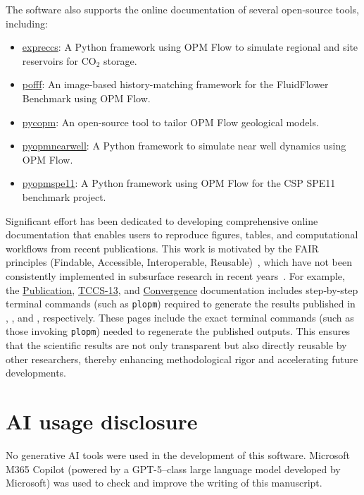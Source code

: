 \documentclass[11pt]{article}
\begin{document}
The software also supports the online documentation of several open‑source tools, including:
\begin{itemize}
\item \href{https://github.com/cssr-tools/expreccs}{expreccs}: A Python framework using OPM Flow to simulate regional and site reservoirs for CO$_2$ storage. 
\item \href{https://github.com/cssr-tools/pofff}{pofff}: An image-based history-matching framework for the FluidFlower Benchmark using OPM Flow.
\item \href{https://github.com/cssr-tools/pycopm}{pycopm}: An open-source tool to tailor OPM Flow geological models.
\item \href{https://github.com/cssr-tools/pyopmnearwell}{pyopmnearwell}: A Python framework to simulate near well dynamics using OPM Flow.
\item \href{https://github.com/OPM/pyopmspe11}{pyopmspe11}: A Python framework using OPM Flow for the CSP SPE11 benchmark project.
\end{itemize}

\noindent Significant effort has been dedicated to developing comprehensive online documentation that enables users to reproduce figures, tables, and computational workflows from recent publications. This work is motivated by the FAIR principles (Findable, Accessible, Interoperable, Reusable)~\citep{Wilkinson2016}, which have not been consistently implemented in subsurface research in recent years~\citep{liu2025}. For example, the \href{https://cssr-tools.github.io/pofff/publication.html}{Publication}, \href{https://cssr-tools.github.io/expreccs/tccs-13.html#}{TCCS-13}, and \href{https://opm.github.io/pyopmspe11/convergence.html}{Convergence} documentation includes step‑by‑step terminal commands (such as \texttt{plopm}) required to generate the results published in \cite{10.1007/s11242-025-02275-0}, \cite{landamarban2025}, and \cite{10.2118/231853-PA}, respectively. These pages include the exact terminal commands (such as those invoking \texttt{plopm}) needed to regenerate the published outputs. This ensures that the scientific results are not only transparent but also directly reusable by other researchers, thereby enhancing methodological rigor and accelerating future developments.

\section{AI usage disclosure}
No generative AI tools were used in the development of this software. Microsoft M365 Copilot (powered by a GPT-5–class large language model developed by Microsoft) was used to check and improve the writing of this manuscript.
\end{document}
